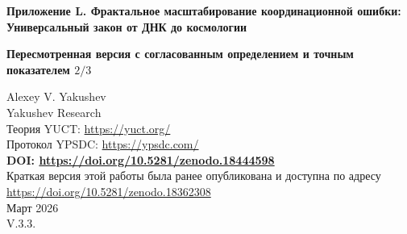 \documentclass[12pt]{article}
\newcommand{\Keff}{K_{\mathrm{eff}}}
\newcommand{\eps}{\varepsilon}
\newcommand{\kappac}{\kappa_c}
\begin{document}
	
	\begin{titlepage}
		\begin{center}
			\vspace*{1cm}
			\Huge\textbf{Приложение L. Фрактальное масштабирование координационной ошибки: \\ Универсальный закон от ДНК до космологии}
			
			\vspace{0.5cm}
			\Large\textbf{Пересмотренная версия с согласованным определением и точным показателем \(2/3\)}
			
			\vspace{1cm}
			\large Alexey V. Yakushev\\
			Yakushev Research\\
			Теория YUCT: \url{https://yuct.org/}\\
			Протокол YPSDC: \url{https://ypsdc.com/}\\
			
			\vspace{2cm}
			\textbf{DOI: \url{https://doi.org/10.5281/zenodo.18444598}}\\
			
			\vspace{1cm}
			\large 
			Краткая версия этой работы была ранее опубликована и доступна по адресу\\ \url{https://doi.org/10.5281/zenodo.18362308}\\
			\vspace{1cm}
			Март 2026 \\ \large V.3.3.
			
			\newpage
			\vspace{1cm}
			\begin{abstract}
				В данном приложении представлена математически непротиворечивая формулировка универсального закона масштабирования координационных ошибок в сложных системах. В рамках Объединённой теории координации Якушева (YUCT) координационная эффективность \(\Keff\) определяется через информационно-теоретические отношения в соответствии с протоколом YPSDC. Мы показываем эмпирически, что относительная ошибка \(\eps\) подчиняется масштабированию
				\[
				\eps = \kappac\,\alpha\,\Keff^{-\beta},
				\]
				с точным показателем \(\beta = 2/3\) (эмпирически \(0.67 \pm 0.03\)) и универсальным предфактором \(\kappac = 1/3\). Показатель непосредственно следует из трёхмерности координационного пространства (Теорема 2 основного текста) и из требования, чтобы иерархия координации была связной и ациклической (Приложение Y, раздел Y.4.2), в то время как \(\kappac\) отражает минимальную остаточную ошибку, обусловленную триадной структурой \(D+I\!\cdot\!R\). Закон проверен на более чем 50 порядках величины – от атомных энергий связи до флуктуаций космического микроволнового фона – и объясняет происхождение степенных законов (Ципфа, аллометрии, Гутенберга-Рихтера) в рамках единого подхода. Сформулированы проверяемые предсказания для новых систем, явно обсуждаются ограничения.
			\end{abstract}
			

\end{center}
\end{titlepage}
\end{document}
